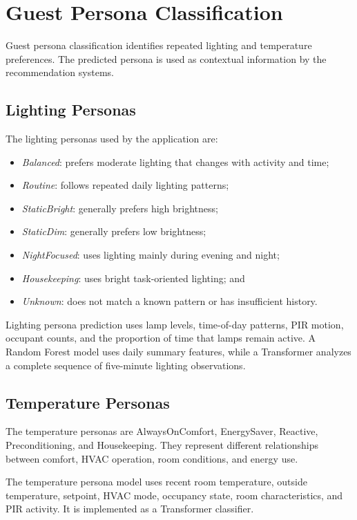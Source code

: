 \chapter{Guest Persona Classification}
\label{chap:persona-classification}

Guest persona classification identifies repeated lighting and temperature
preferences. The predicted persona is used as contextual information by the
recommendation systems.

\section{Lighting Personas}

The lighting personas used by the application are:

\begin{itemize}
    \item \textit{Balanced}: prefers moderate lighting that changes with
    activity and time;
    \item \textit{Routine}: follows repeated daily lighting patterns;
    \item \textit{StaticBright}: generally prefers high brightness;
    \item \textit{StaticDim}: generally prefers low brightness;
    \item \textit{NightFocused}: uses lighting mainly during evening and night;
    \item \textit{Housekeeping}: uses bright task-oriented lighting; and
    \item \textit{Unknown}: does not match a known pattern or has insufficient
    history.
\end{itemize}

Lighting persona prediction uses lamp levels, time-of-day patterns, PIR motion,
occupant counts, and the proportion of time that lamps remain active. A Random
Forest model uses daily summary features, while a Transformer analyzes a
complete sequence of five-minute lighting observations.

\section{Temperature Personas}

The temperature personas are AlwaysOnComfort, EnergySaver, Reactive,
Preconditioning, and Housekeeping. They represent different relationships
between comfort, HVAC operation, room conditions, and energy use.

The temperature persona model uses recent room temperature, outside
temperature, setpoint, HVAC mode, occupancy state, room characteristics, and
PIR activity. It is implemented as a Transformer classifier.


